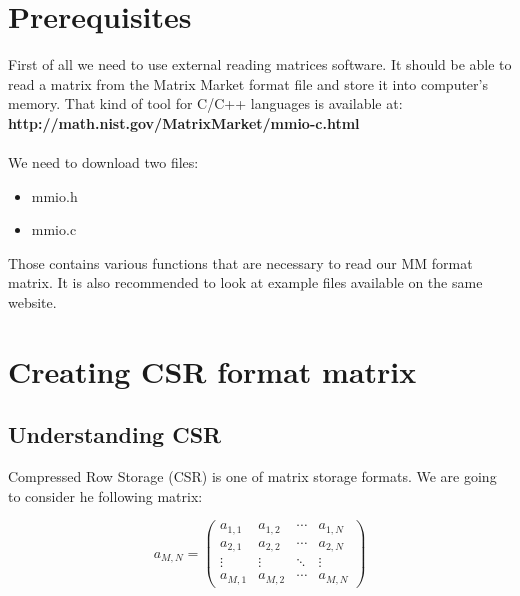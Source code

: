 \documentclass{scrreprt}
\begin{document}
\section{Prerequisites}
First of all we need to use external reading matrices software. It should be able to read a matrix from the Matrix Market format file and store it into computer's memory. That kind of tool for C/C++ languages is available at: \\
\textbf{http://math.nist.gov/MatrixMarket/mmio-c.html} 
\\
\\
We need to download two files:
\begin{itemize}
\item  mmio.h
\item  mmio.c

\end{itemize}

Those contains various functions that are necessary to read our MM format matrix. It is also recommended to look at example files available on the same website.


\section{Creating CSR format matrix}

\subsection{Understanding CSR}

Compressed Row Storage (CSR) is one of matrix storage formats. We are going to consider he following matrix: 

\begin{equation} \label{cage4}
a_{M,N} = 
 \begin{pmatrix}
  a_{1,1} & a_{1,2} & \cdots & a_{1,N} \\
  a_{2,1} & a_{2,2} & \cdots & a_{2,N} \\
  \vdots  & \vdots  & \ddots & \vdots  \\
  a_{M,1} & a_{M,2} & \cdots & a_{M,N} 
 \end{pmatrix} 
\end{equation}
\end{document}
